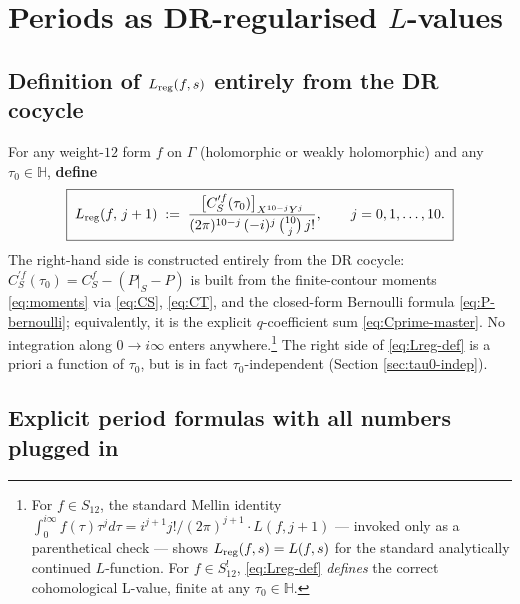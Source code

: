 \documentclass[11pt,letterpaper]{article}
\newcommand{\HH}{\mathbb{H}}
\begin{document}
\section{Periods as DR-regularised $L$-values}\label{sec:Lreg}

\subsection{Definition of $L_{\rm reg}(f, s)$ entirely from the DR cocycle}

For any weight-$12$ form $f$ on $\Gamma$ (holomorphic or weakly holomorphic) and
any $\tau_0 \in \HH$, \textbf{define}
\begin{equation}\label{eq:Lreg-def}
  \boxed{\;
  L_{\rm reg}(f,\,j+1)
    \;:=\;
    \frac{\bigl[C^{\prime f}_S(\tau_0)\bigr]_{X^{10-j}Y^j}}
         {(2\pi)^{10-j}\,(-i)^j\,\binom{10}{j}\,j!},
    \qquad j = 0, 1, \ldots, 10.
  \;}
\end{equation}
The right-hand side is constructed entirely from the DR cocycle: $C^{\prime
f}_S(\tau_0) = C_S^f - (P|_S - P)$ is built from the finite-contour moments
\eqref{eq:moments} via \eqref{eq:CS}, \eqref{eq:CT}, and the closed-form
Bernoulli formula \eqref{eq:P-bernoulli}; equivalently, it is the explicit
$q$-coefficient sum \eqref{eq:Cprime-master}.  No integration along
$0 \to i\infty$ enters anywhere.\footnote{For $f \in S_{12}$, the standard
Mellin identity $\int_0^{i\infty}f(\tau)\tau^j d\tau = i^{j+1}j!/(2\pi)^{j+1}
\cdot L(f, j+1)$ — invoked only as a parenthetical check — shows
$L_{\rm reg}(f, s) = L(f, s)$ for the standard analytically continued
$L$-function. For $f \in S_{12}^!$, \eqref{eq:Lreg-def} \emph{defines} the
correct cohomological L-value, finite at any $\tau_0 \in \HH$.}
The right side of \eqref{eq:Lreg-def} is a priori a function of $\tau_0$, but
is in fact $\tau_0$-independent (Section \ref{sec:tau0-indep}).

\subsection{Explicit period formulas with all numbers plugged in}
\end{document}
